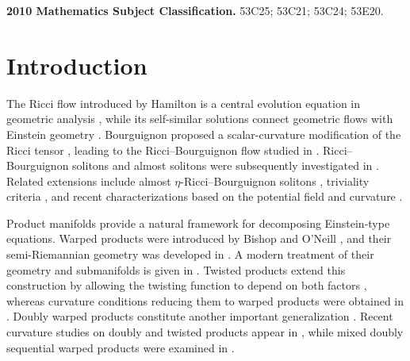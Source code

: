 \documentclass[a4paper,11pt]{article}
\theoremstyle{plain}
\numberwithin{equation}{section}
\begin{document}
\textbf{2010 Mathematics Subject Classification.} 53C25; 53C21; 53C24; 53E20.

\section{Introduction}
\label{sec:introduction}

The Ricci flow introduced by Hamilton is a central evolution
equation in geometric analysis \cite{Hamilton1982}, while its
self-similar solutions connect geometric flows with Einstein
geometry \cite{Besse2008}. Bourguignon proposed a scalar-curvature
modification of the Ricci tensor \cite{Bourguignon1981}, leading to
the Ricci--Bourguignon flow studied in
\cite{CatinoEtAl2017}. Ricci--Bourguignon solitons and almost
solitons were subsequently investigated in \cite{Dwivedi2021}.
Related extensions include almost
\(\eta\)-Ricci--Bourguignon solitons \cite{BlagaTastan2021},
triviality criteria \cite{Ghosh2022}, and recent characterizations
based on the potential field and curvature
\cite{AlSodaisEtAl2025}.

Product manifolds provide a natural framework for decomposing
Einstein-type equations. Warped products were introduced by Bishop
and O'Neill \cite{BishopONeill1969}, and their semi-Riemannian
geometry was developed in \cite{ONeill1983}. A modern treatment of
their geometry and submanifolds is given in \cite{Chen2017}.
Twisted products extend this construction by allowing the twisting
function to depend on both factors \cite{PongeReckziegel1993},
whereas curvature conditions reducing them to warped products were
obtained in \cite{FernandezLopezEtAl2001}. Doubly warped products
constitute another important generalization \cite{Unal2001}.
Recent curvature studies on doubly and twisted products appear in
\cite{ElsharkawyEtAl2025Pseudo}, while mixed doubly sequential
warped products were examined in
\cite{ElsayiedTawfiqElsharkawy2025}.
\end{document}
